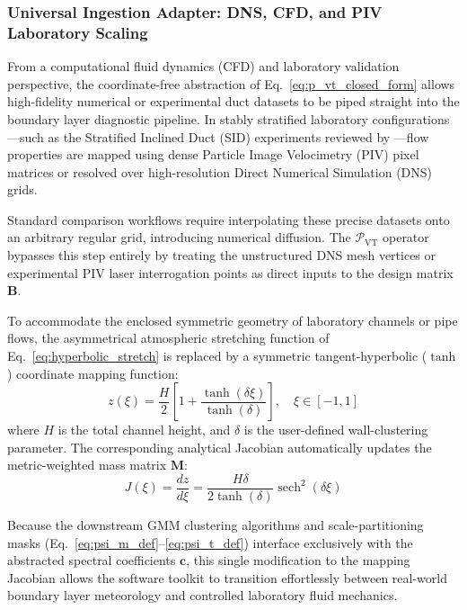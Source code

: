 \documentclass[11pt,a4paper]{article}
\begin{document}
\subsubsection{Universal Ingestion Adapter: DNS, CFD, and PIV Laboratory Scaling}
\label{sec:extensions:cfd_ingest}

From a computational fluid dynamics (CFD) and laboratory validation perspective, the coordinate-free abstraction of Eq.~\ref{eq:p_vt_closed_form} allows high-fidelity numerical or experimental duct datasets to be piped straight into the boundary layer diagnostic pipeline. In stably stratified laboratory configurations—such as the Stratified Inclined Duct (SID) experiments reviewed by \citet{Lefauve2025}—flow properties are mapped using dense Particle Image Velocimetry (PIV) pixel matrices or resolved over high-resolution Direct Numerical Simulation (DNS) grids.

Standard comparison workflows require interpolating these precise datasets onto an arbitrary regular grid, introducing numerical diffusion. The $\mathcal{P}_{\mathrm{VT}}$ operator bypasses this step entirely by treating the unstructured DNS mesh vertices or experimental PIV laser interrogation points as direct inputs to the design matrix $\mathbf{B}$.

To accommodate the enclosed symmetric geometry of laboratory channels or pipe flows, the asymmetrical atmospheric stretching function of Eq.~\ref{eq:hyperbolic_stretch} is replaced by a symmetric tangent-hyperbolic ($\tanh$) coordinate mapping function:
\begin{equation}
z(\xi) = \frac{H}{2} \left[ 1 + \frac{\tanh(\delta \xi)}{\tanh(\delta)} \right], \quad \xi \in [-1, 1]
\label{eq:tanh_stretch}
\end{equation}
where $H$ is the total channel height, and $\delta$ is the user-defined wall-clustering parameter. The corresponding analytical Jacobian automatically updates the metric-weighted mass matrix $\mathbf{M}$:
\begin{equation}
J(\xi) = \frac{dz}{d\xi} = \frac{H \delta}{2 \tanh(\delta)} \operatorname{sech}^2(\delta \xi)
\label{eq:jacobian_tanh}
\end{equation}

Because the downstream GMM clustering algorithms and scale-partitioning masks (Eq.~\ref{eq:psi_m_def}--\ref{eq:psi_t_def}) interface exclusively with the abstracted spectral coefficients $\mathbf{c}$, this single modification to the mapping Jacobian allows the software toolkit to transition effortlessly between real-world boundary layer meteorology and controlled laboratory fluid mechanics.
\end{document}
